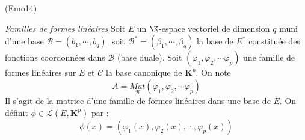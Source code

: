 \begin{tiny}(Emo14)\end{tiny}
\emph{Familles de formes lin{\'e}aires}\newline
Soit $E$ un $\K$-espace vectoriel de dimension $q$ muni d'une base $\mathcal{B}=(b_1,\cdots,b_q)$, soit $\mathcal B^* =(\beta_1,\cdots,\beta_q)$ la base de $E^*$ constituée des fonctions coordonnées dans $\mathcal B$ (base duale).\newline
Soit $(\varphi _{1},\varphi _{2},\cdots \varphi_{p})$ une famille de formes lin{\'e}aires sur $E$ et $\mathcal{C}$ la base canonique de $\mathbf{K}^{p}$. On note
\begin{displaymath}
A=\underset{\mathcal{B}}{Mat}(\varphi_{1},\varphi _{2},\cdots \varphi _{p}) 
\end{displaymath}
Il s'agit de la matrice d'une famille de formes linéaires dans une base de $E$.\newline
On d{\'e}finit $\phi \in \mathcal{L}(E,\mathbf{K}^{p})$ par :
\begin{displaymath}
 \phi (x)=(\varphi _{1}(x),\varphi _{2}(x),\cdots, \varphi _{p}(x))
\end{displaymath}

